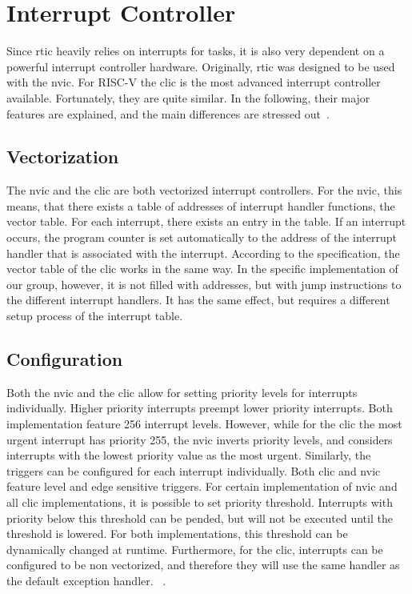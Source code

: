 \section{Interrupt Controller}
\label{sec:interrupt_controller}
Since \gls{rtic} heavily relies on interrupts for tasks, it is also very dependent on a powerful interrupt controller hardware.
Originally, \gls{rtic} was designed to be used with the \gls{nvic}.
For RISC-V the \gls{clic} is the most advanced interrupt controller available.
Fortunately, they are quite similar.
In the following, their major features are explained, and the main differences are stressed out~\cite{NVIC}\cite{CLIC}. 

\subsection{Vectorization}
\label{sec:vectorization}
The \gls{nvic} and the \gls{clic} are both vectorized interrupt controllers.
For the \gls{nvic}, this means, that there exists a table of addresses of interrupt handler functions, the vector table. For each interrupt, there exists an entry in the table. If an interrupt occurs, the program counter is set automatically to the address of the interrupt handler that is associated with the interrupt.
According to the specification, the vector table of the \gls{clic} works in the same way.
In the specific implementation of our group, however, it is not filled with addresses, but with jump instructions to the different interrupt handlers.
It has the same effect, but requires a different setup process of the interrupt table.~\cite{NVIC}\cite{CLIC}

\subsection{Configuration}
\label{sec:interrupt_configuration}
Both the \gls{nvic} and the \gls{clic} allow for setting priority levels for interrupts individually.
Higher priority interrupts preempt lower priority interrupts.
Both implementation feature 256 interrupt levels. However, while for the \gls{clic} the most urgent interrupt has priority 255, the \gls{nvic} inverts priority levels, and considers interrupts with the lowest priority value as the most urgent.
Similarly, the triggers can be configured for each interrupt individually. Both \gls{clic} and \gls{nvic} feature level and edge sensitive triggers. For certain implementation of \gls{nvic} and all \gls{clic} implementations, it is possible to set priority threshold. Interrupts with priority below this threshold can be pended, but will not be executed until the threshold is lowered. For both implementations, this threshold can be dynamically changed at runtime.
Furthermore, for the \gls{clic}, interrupts can be configured to be non vectorized, and therefore they will use the same handler as the default exception handler. 
~\cite{NVIC}\cite{CLIC}.

